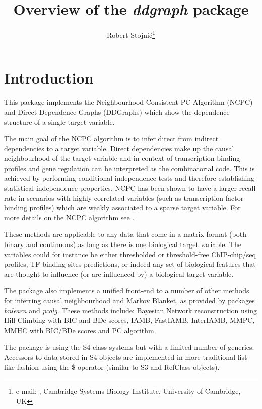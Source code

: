 \documentclass{article}
\author{Robert Stojni\'{c}\footnote{
  e-mail: \email{robert.stojnic@gmail.com},
  Cambridge Systems Biology Institute,
  University of Cambridge, UK}
}
\newcommand{\Rpackage}[1]{{\textit{#1}}}
\begin{document}
\title{Overview of the \Rpackage{ddgraph} package}

\maketitle

\tableofcontents

\section{Introduction}\label{sec:intro} 

This package implements the Neighbourhood Consistent PC Algorithm (NCPC) and Direct Dependence Graphs (DDGraphs) which show the dependence structure of a single target variable. 

The main goal of the NCPC algorithm is to infer direct from indirect dependencies to a target variable. Direct dependencies make up the causal neighbourhood of the target variable and in context of transcription binding profiles and gene regulation can be interpreted as the combinatorial code. This is achieved by performing conditional independence tests and therefore establishing statistical independence properties. NCPC has been shown to have a larger recall rate in scenarios with highly correlated variables (such as transcription factor binding profiles) which are weakly associated to a sparse target variable. For more details on the NCPC algorithm see \citep{stojnic_2012}. 

These methods are applicable to any data that come in a matrix format (both binary and continuous) as long as there is one biological target variable. The variables could for instance be either thresholded or threshold-free ChIP-chip/seq profiles, TF binding sites predictions, or indeed any set of biological features that are thought to influence (or are influenced by) a biological target variable. 

The package also implements a unified front-end to a number of other methods for inferring causal neighbourhood and Markov Blanket, as provided by packages \Rpackage{bnlearn} and \Rpackage{pcalg}. These methods include: Bayesian Network reconstruction using Hill-Climbing with BIC and BDe scores, IAMB, FastIAMB, InterIAMB, MMPC, MMHC with BIC/BDe scores and PC algorithm. 

The package is using the S4 class systems but with a limited number of generics. Accessors to data stored in S4 objects are implemented in more traditional list-like fashion using the \$ operator (similar to S3 and RefClass objects). 
\end{document}

